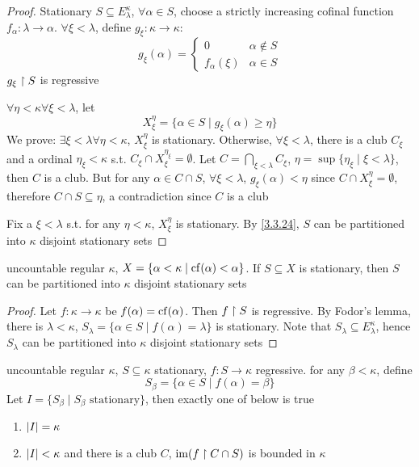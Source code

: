 \documentclass[11pt]{article}
\begin{document}
\begin{proof}
Stationary \(S\subseteq E^\kappa_\lambda\), \(\forall\alpha\in S\), choose a strictly increasing cofinal
function \(f_\alpha:\lambda\to\alpha\). \(\forall\xi<\lambda\), define \(g_\xi:\kappa\to\kappa\):
\begin{equation*}
g_\xi(\alpha)=
\begin{cases}
0&\alpha\notin S\\
f_\alpha(\xi)&\alpha\in S
\end{cases}
\end{equation*}
\(g_\xi\upharpoonright S\) is regressive

\(\forall\eta<\kappa\forall\xi<\lambda\), let
\begin{equation*}
X_\xi^\eta=\{\alpha\in S\mid g_\xi(\alpha)\ge\eta\}
\end{equation*}
We prove: \(\exists\xi<\lambda\forall\eta<\kappa\), \(X_\xi^\eta\) is stationary. Otherwise, \(\forall\xi<\lambda\), there is a club \(C_\xi\)
and a ordinal \(\eta_\xi<\kappa\) s.t. \(C_\xi\cap X_\xi^{\eta_\xi}=\emptyset\). Let \(C=\bigcap_{\xi<\lambda}C_\xi\), \(\eta=\sup\{\eta_\xi\mid\xi<\lambda\}\),
then \(C\) is a club. But for any \(\alpha\in C\cap S\), \(\forall\xi<\lambda\), \(g_\xi(\alpha)<\eta\) since \(C\cap X_\xi^\eta=\emptyset\), therefore \(C\cap S\subseteq\eta\), a
contradiction since \(C\) is a club

Fix a \(\xi<\lambda\) s.t. for any \(\eta<\kappa\), \(X_\xi^\eta\) is stationary. By \ref{3.3.24}, \(S\) can be
partitioned into \(\kappa\) disjoint stationary sets
\end{proof}

\begin{corollary}[]
\label{3.3.26}
uncountable regular \(\kappa\), \(X=\{\alpha<\kappa\mid\operatorname{cf}(\alpha)<\alpha\}\). If \(S\subseteq X\) is stationary, then \(S\) can be
partitioned into \(\kappa\) disjoint stationary sets
\end{corollary}

\begin{proof}
Let \(f:\kappa\to\kappa\) be \(f(\alpha)=\operatorname{cf}(\alpha)\). Then \(f\upharpoonright S\) is regressive. By Fodor's lemma, there
is \(\lambda<\kappa\), \(S_\lambda=\{\alpha\in S\mid f(\alpha)=\lambda\}\) is stationary. Note that \(S_\lambda\subseteq E_\lambda^\kappa\), hence \(S_\lambda\) can be
partitioned into \(\kappa\) disjoint stationary sets
\end{proof}

\begin{lemma}[skip]
uncountable regular \(\kappa\), \(S\subseteq\kappa\) stationary, \(f:S\to\kappa\) regressive. for any \(\beta<\kappa\), define
\begin{equation*}
S_\beta=\{\alpha\in S\mid f(\alpha)=\beta\}
\end{equation*}
Let \(I=\{S_\beta\mid S_\beta\text{ stationary}\}\), then exactly one of below is true
\begin{enumerate}
\item \(\abs{I}=\kappa\)
\item \(\abs{I}<\kappa\) and there is a club \(C\), \(\operatorname{im}(f\upharpoonright C\cap S)\) is bounded in \(\kappa\)
\end{enumerate}
\end{lemma}
\end{document}
